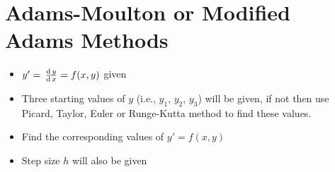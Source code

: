 \documentclass[../main-sheet.tex]{subfiles}
\begin{document}
\section{Adams-Moulton or Modified Adams Methods}
\begin{itemize}
    \item \(y'=\,\frac{\mathrm{d}\,y}{\mathrm{d}\,x}=f(x,y)\) given
    \item Three starting values of \(y\) (i.e., \(y_1,\,y_2,\,y_3\)) will be given, if not then use Picard, Taylor, Euler or Runge-Kutta method to find these values.
    \item Find the corresponding values of \(y'=f(x,y)\)
    \item Step size \(h\) will also be given
\end{itemize}
\end{document}

